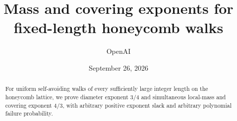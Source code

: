 \documentclass[11pt,oneside]{article}
\title{Mass and covering exponents for fixed-length honeycomb walks}
\author{OpenAI}
\date{September 26, 2026}
\theoremstyle{definition}
\theoremstyle{remark}
\begin{document}
\maketitle
\begin{abstract}
For uniform self-avoiding walks of every sufficiently large integer length on the honeycomb lattice, we prove diameter exponent $3/4$ and simultaneous local-mass and covering exponent $4/3$, with arbitrary positive exponent slack and arbitrary polynomial failure probability.
\end{abstract}









\appendix


\end{document}
